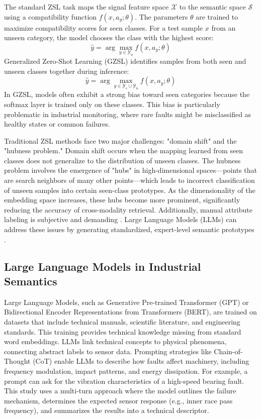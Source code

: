 \documentclass[journal]{IEEEtran}
\begin{document}
The standard ZSL task maps the signal feature space $\mathcal{X}$ to the semantic space $\mathcal{S}$ using a compatibility function $f(x, a_y; \theta)$. The parameters $\theta$ are trained to maximize compatibility scores for seen classes. For a test sample $x$ from an unseen category, the model chooses the class with the highest score:
\begin{equation}
\hat{y} = \arg\max_{y \in \mathcal{Y}_u} f(x, a_y; \theta)
\end{equation}
Generalized Zero-Shot Learning (GZSL) identifies samples from both seen and unseen classes together during inference:
\begin{equation}
\hat{y} = \arg\max_{y \in \mathcal{Y}_s \cup \mathcal{Y}_u} f(x, a_y; \theta)
\end{equation}
In GZSL, models often exhibit a strong bias toward seen categories because the softmax layer is trained only on these classes. This bias is particularly problematic in industrial monitoring, where rare faults might be misclassified as healthy states or common failures.

Traditional ZSL methods face two major challenges: "domain shift" and the "hubness problem." Domain shift occurs when the mapping learned from seen classes does not generalize to the distribution of unseen classes. The hubness problem involves the emergence of "hubs" in high-dimensional spaces—points that are search neighbors of many other points—which leads to incorrect classification of unseen samples into certain seen-class prototypes. As the dimensionality of the embedding space increases, these hubs become more prominent, significantly reducing the accuracy of cross-modality retrieval. Additionally, manual attribute labeling is subjective and demanding \cite{palatucci2009zero, lampert2009learning}. Large Language Models (LLMs) can address these issues by generating standardized, expert-level semantic prototypes \cite{xian2018zero}.

\subsection{Large Language Models in Industrial Semantics}
Large Language Models, such as Generative Pre-trained Transformer (GPT) or Bidirectional Encoder Representations from Transformers (BERT), are trained on datasets that include technical manuals, scientific literature, and engineering standards. This training provides technical knowledge missing from standard word embeddings. LLMs link technical concepts to physical phenomena, connecting abstract labels to sensor data. Prompting strategies like Chain-of-Thought (CoT) enable LLMs to describe how faults affect machinery, including frequency modulation, impact patterns, and energy dissipation. For example, a prompt can ask for the vibration characteristics of a high-speed bearing fault. This study uses a multi-turn approach where the model outlines the failure mechanism, determines the expected sensor response (e.g., inner race pass frequency), and summarizes the results into a technical descriptor.
\end{document}
